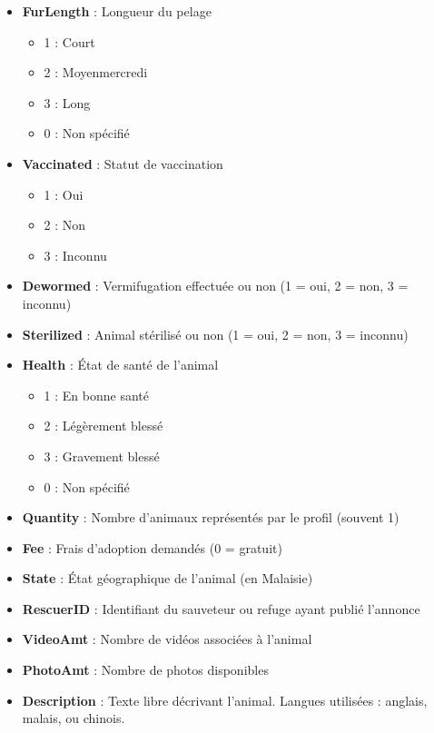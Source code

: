 \documentclass[a4paper,12pt]{article}
\begin{document}
\begin{itemize}
    \item \textbf{FurLength} : Longueur du pelage
          \begin{itemize}
              \item 1 : Court
              \item 2 : Moyenmercredi
              \item 3 : Long
              \item 0 : Non spécifié
          \end{itemize}

    \item \textbf{Vaccinated} : Statut de vaccination
          \begin{itemize}
              \item 1 : Oui
              \item 2 : Non
              \item 3 : Inconnu
          \end{itemize}

    \item \textbf{Dewormed} : Vermifugation effectuée ou non (1 = oui, 2 = non, 3 = inconnu)

    \item \textbf{Sterilized} : Animal stérilisé ou non (1 = oui, 2 = non, 3 = inconnu)

    \item \textbf{Health} : État de santé de l’animal
          \begin{itemize}
              \item 1 : En bonne santé
              \item 2 : Légèrement blessé
              \item 3 : Gravement blessé
              \item 0 : Non spécifié
          \end{itemize}

    \item \textbf{Quantity} : Nombre d’animaux représentés par le profil (souvent 1)

    \item \textbf{Fee} : Frais d’adoption demandés (0 = gratuit)

    \item \textbf{State} : État géographique de l’animal (en Malaisie)

    \item \textbf{RescuerID} : Identifiant du sauveteur ou refuge ayant publié l’annonce

    \item \textbf{VideoAmt} : Nombre de vidéos associées à l’animal

    \item \textbf{PhotoAmt} : Nombre de photos disponibles

    \item \textbf{Description} : Texte libre décrivant l’animal. Langues utilisées : anglais, malais, ou chinois.
\end{itemize}
\end{document}
